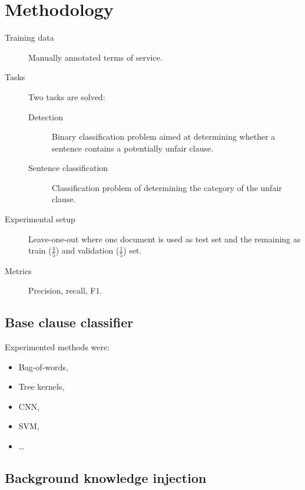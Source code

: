 \section{Methodology}

\begin{description}
    \item[Training data]
        Manually annotated terms of service.

    \item[Tasks] Two tasks are solved:
        \begin{description}
            \item[Detection] Binary classification problem aimed at determining whether a sentence contains a potentially unfair clause.
            \item[Sentence classification] Classification problem of determining the category of the unfair clause.
        \end{description}

    \item[Experimental setup]
        Leave-one-out where one document is used as test set and the remaining as train ($\frac{4}{5}$) and validation ($\frac{1}{5}$) set.

    \item[Metrics] Precision, recall, F1.
\end{description}


\subsection{Base clause classifier}

Experimented methods were:
\begin{itemize}
    \item Bag-of-words,
    \item Tree kernels,
    \item CNN,
    \item SVM,
    \item \dots
\end{itemize}


\subsection{Background knowledge injection}

